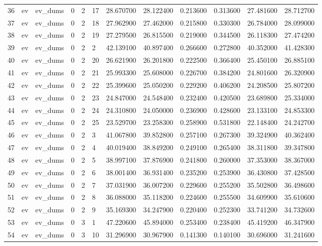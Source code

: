 \begin{tabular}{llllllrrrrrr}
36 & ev & ev_dums & 0 & 2 & 17 & 28.670700 & 28.122400 & 0.213600 & 0.313600 & 27.481600 & 28.712700 \\
37 & ev & ev_dums & 0 & 2 & 18 & 27.962900 & 27.462000 & 0.215800 & 0.330300 & 26.784000 & 28.099000 \\
38 & ev & ev_dums & 0 & 2 & 19 & 27.279500 & 26.815500 & 0.219000 & 0.344500 & 26.118300 & 27.474200 \\
39 & ev & ev_dums & 0 & 2 & 2 & 42.139100 & 40.897400 & 0.266600 & 0.272800 & 40.352000 & 41.428300 \\
40 & ev & ev_dums & 0 & 2 & 20 & 26.621900 & 26.201800 & 0.222500 & 0.366400 & 25.450100 & 26.885100 \\
41 & ev & ev_dums & 0 & 2 & 21 & 25.993300 & 25.608000 & 0.226700 & 0.384200 & 24.801600 & 26.320900 \\
42 & ev & ev_dums & 0 & 2 & 22 & 25.399600 & 25.050200 & 0.229200 & 0.406200 & 24.208500 & 25.807200 \\
43 & ev & ev_dums & 0 & 2 & 23 & 24.847000 & 24.548400 & 0.232400 & 0.420500 & 23.689800 & 25.334000 \\
44 & ev & ev_dums & 0 & 2 & 24 & 24.310800 & 24.050000 & 0.236900 & 0.428600 & 23.133100 & 24.853300 \\
45 & ev & ev_dums & 0 & 2 & 25 & 23.529700 & 23.258300 & 0.258900 & 0.531800 & 22.148400 & 24.242700 \\
46 & ev & ev_dums & 0 & 2 & 3 & 41.067800 & 39.852800 & 0.257100 & 0.267300 & 39.324900 & 40.362400 \\
47 & ev & ev_dums & 0 & 2 & 4 & 40.019400 & 38.849200 & 0.249100 & 0.265400 & 38.311800 & 39.347800 \\
48 & ev & ev_dums & 0 & 2 & 5 & 38.997100 & 37.876900 & 0.241800 & 0.260000 & 37.353000 & 38.367000 \\
49 & ev & ev_dums & 0 & 2 & 6 & 38.001400 & 36.931400 & 0.235200 & 0.253900 & 36.430800 & 37.428500 \\
50 & ev & ev_dums & 0 & 2 & 7 & 37.031900 & 36.007200 & 0.229600 & 0.255200 & 35.502800 & 36.498600 \\
51 & ev & ev_dums & 0 & 2 & 8 & 36.088000 & 35.118200 & 0.224600 & 0.255500 & 34.609900 & 35.610600 \\
52 & ev & ev_dums & 0 & 2 & 9 & 35.169300 & 34.247900 & 0.220400 & 0.252300 & 33.741200 & 34.732600 \\
53 & ev & ev_dums & 0 & 3 & 1 & 47.220600 & 45.894000 & 0.253400 & 0.238400 & 45.419200 & 46.347900 \\
54 & ev & ev_dums & 0 & 3 & 10 & 31.296900 & 30.967900 & 0.141300 & 0.140100 & 30.696000 & 31.241600 \\

\end{tabular}

